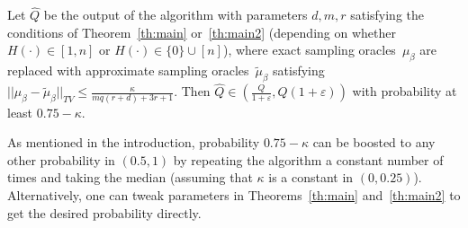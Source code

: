 \documentclass[final,12pt]{colt2018}
\def\bmin{{\beta_{\min}}}
\def\bmax{{\beta_{\max}}}
\begin{document}
\begin{theorem}
Let $\hat Q$ be the output of the algorithm with parameters $d,m,r$ satisfying
the conditions of Theorem~\ref{th:main} or~\ref{th:main2} (depending on whether $H(\cdot)\in[1,n]$ or $H(\cdot)\in\{0\}\cup[n]$),
where exact sampling oracles~$\mu_\beta$ are replaced with
approximate sampling oracles~$\tilde\mu_\beta$ satisfying
 $ ||\mu_\beta-\tilde\mu_\beta||_{TV} \le \frac{\kappa}{mq(r+d)+3r+1}$.
Then $\hat Q\in(\frac{Q}{1+\varepsilon},Q(1+\varepsilon))$ 
with probability at least $0.75-\kappa$. %
\end{theorem}

As mentioned in the introduction, probability $0.75-\kappa$ can be boosted to any other probability in $(0.5,1)$
by repeating the algorithm a constant number of times and taking the median (assuming that $\kappa$ is a constant in $(0,0.25)$).
Alternatively, one can tweak parameters in Theorems~\ref{th:main} and~\ref{th:main2} to get the desired probability directly.
\end{document}
